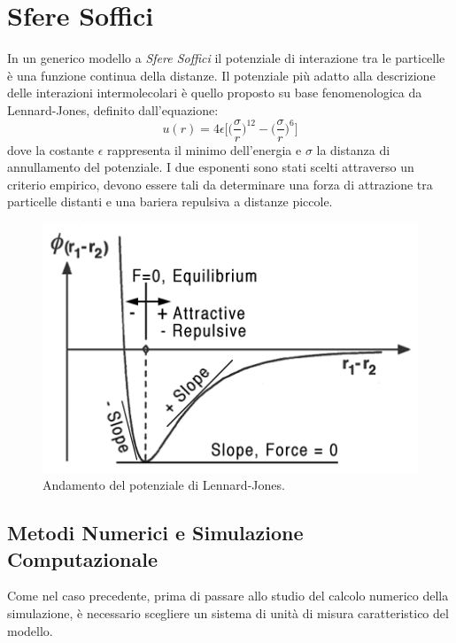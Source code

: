 \newpage
\section{Sfere Soffici}\label{Soffici}
In un generico modello a \emph{Sfere Soffici} il potenziale di interazione tra le particelle è una funzione continua della distanze.
\newline
Il potenziale più adatto alla descrizione delle interazioni intermolecolari è quello proposto su base fenomenologica da Lennard-Jones, definito dall'equazione:
\begin{equation}
u(r) = 4\epsilon \biggr[\big(\frac{\sigma}{r} \big)^{12} - \big(\frac{\sigma}{r} \big)^6 \biggr]
\end{equation}
dove la costante $\epsilon$ rappresenta il minimo dell'energia e $\sigma$ la distanza di annullamento del potenziale.
\newline
I due esponenti sono stati scelti attraverso un criterio empirico, devono essere tali da determinare una forza di attrazione tra particelle distanti e una bariera repulsiva a distanze piccole.

	\begin{figure}[htbp]
		\centering
		\includegraphics[scale=0.5]{Immagini/LJ}
		\caption[Potenziale di L.-J.]{Andamento del potenziale di Lennard-Jones.}\label{fig: LJunCut}
	\end{figure}




\FloatBarrier 
\subsection{Metodi Numerici e Simulazione Computazionale}
Come nel caso precedente, prima di passare allo studio del calcolo numerico della simulazione, è necessario scegliere un sistema di unità di misura caratteristico del modello.

